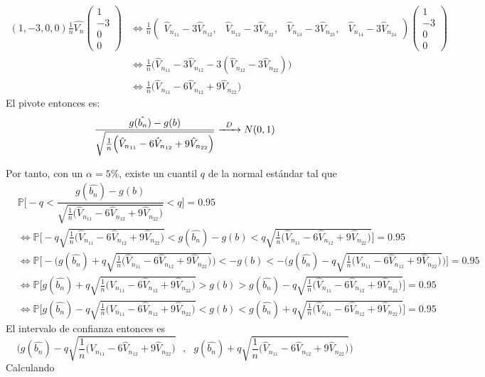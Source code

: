 \documentclass[
]{article}
\begin{document}
\[
\begin{aligned}
  (1,-3,0,0)\frac{1}{n}\hat{V_n}\begin{pmatrix} 1 \\ -3 \\ 0 \\ 0\end{pmatrix}
  &\iff
  \frac{1}{n} \begin{pmatrix} \hat{V}_{n_{11}} - 3\hat{V}_{n_{12}}, & \hat{V}_{n_{12}} - 3\hat{V}_{n_{22}}, & \hat{V}_{n_{13}} - 3\hat{V}_{n_{23}}, & \hat{V}_{n_{14}} - 3\hat{V}_{n_{24}}\end{pmatrix} \begin{pmatrix} 1 \\ -3 \\ 0 \\ 0\end{pmatrix} \\
  &\iff
  \frac{1}{n} \Big(\hat{V}_{n_{11}} - 3\hat{V}_{n_{12}} -3(\hat{V}_{n_{12}} - 3\hat{V}_{n_{22}})\Big) \\
  &\iff
  \frac{1}{n} \Big(\hat{V}_{n_{11}} - 6\hat{V}_{n_{12}} + 9\hat{V}_{n_{22}}\Big)
\end{aligned}
\] El pivote entonces es: \[
\dfrac{g(\hat{b_n}) - g(b)}{\sqrt{\frac{1}{n} \Big(\hat{V}_{n_{11}} - 6\hat{V}_{n_{12}} + 9\hat{V}_{n_{22}}\Big)}} \xrightarrow{\enskip D\enskip} N(0,1)
\]

Por tanto, con un \(\alpha=5\%\), existe un cuantil \(q\) de la normal
estándar tal que \[
\begin{aligned}
  &\mathbb{P}\Bigg[ -q < \dfrac{g(\hat{b_n}) - g(b)}{\sqrt{\frac{1}{n} \Big(\hat{V}_{n_{11}} - 6\hat{V}_{n_{12}} + 9\hat{V}_{n_{22}}\Big)}} < q \Bigg] = 0.95 \\
  &\iff
  \mathbb{P}\Bigg[ -q\sqrt{\frac{1}{n} \Big(\hat{V}_{n_{11}} - 6\hat{V}_{n_{12}} + 9\hat{V}_{n_{22}}\Big)} < g(\hat{b_n}) - g(b) < q\sqrt{\frac{1}{n} \Big(\hat{V}_{n_{11}} - 6\hat{V}_{n_{12}} + 9\hat{V}_{n_{22}}\Big)} \Bigg] = 0.95 \\
  &\iff
  \mathbb{P}\Bigg[ - \Bigg(g(\hat{b_n}) + q\sqrt{\frac{1}{n} \Big(\hat{V}_{n_{11}} - 6\hat{V}_{n_{12}} + 9\hat{V}_{n_{22}}\Big)}\Bigg) <  - g(b) < - \Bigg(g(\hat{b_n}) - q\sqrt{\frac{1}{n} \Big(\hat{V}_{n_{11}} - 6\hat{V}_{n_{12}} + 9\hat{V}_{n_{22}}\Big)}\Bigg) \Bigg] = 0.95 \\
  &\iff
  \mathbb{P}\Bigg[ g(\hat{b_n}) + q\sqrt{\frac{1}{n} \Big(\hat{V}_{n_{11}} - 6\hat{V}_{n_{12}} + 9\hat{V}_{n_{22}}\Big)} > g(b) > g(\hat{b_n}) - q\sqrt{\frac{1}{n} \Big(\hat{V}_{n_{11}} - 6\hat{V}_{n_{12}} + 9\hat{V}_{n_{22}}\Big)} \Bigg] = 0.95 \\
  &\iff
  \mathbb{P}\Bigg[ g(\hat{b_n}) - q\sqrt{\frac{1}{n} \Big(\hat{V}_{n_{11}} - 6\hat{V}_{n_{12}} + 9\hat{V}_{n_{22}}\Big)} < g(b) < g(\hat{b_n}) + q\sqrt{\frac{1}{n} \Big(\hat{V}_{n_{11}} - 6\hat{V}_{n_{12}} + 9\hat{V}_{n_{22}}\Big)} \Bigg] = 0.95
\end{aligned}
\] El intervalo de confianza entonces es \[
\Bigg(g(\hat{b_n}) - q\sqrt{\frac{1}{n} \Big(\hat{V}_{n_{11}} - 6\hat{V}_{n_{12}} + 9\hat{V}_{n_{22}}\Big)} \ \ \ , \ \ \ g(\hat{b_n}) + q\sqrt{\frac{1}{n} \Big(\hat{V}_{n_{11}} - 6\hat{V}_{n_{12}} + 9\hat{V}_{n_{22}}\Big)}\Bigg)
\] Calculando
\end{document}
